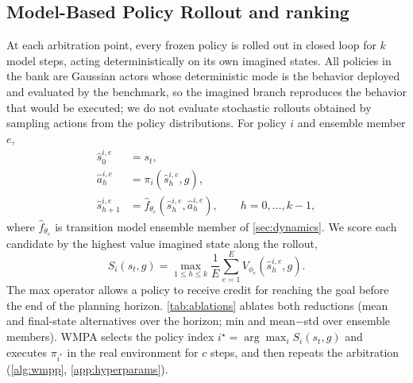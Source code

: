 \documentclass{article}
\theoremstyle{plain}
\theoremstyle{definition}
\theoremstyle{plain}
\newcommand{\wmpa}{\textsc{WMPA}}
\begin{document}
\subsection{Model-Based Policy Rollout and ranking}
\label{sec:counterfactual}
At each arbitration point, every frozen policy is rolled out in closed loop for $k$ model steps, acting deterministically on its own imagined states. All policies in the bank are Gaussian actors whose deterministic mode is the behavior deployed and evaluated by the benchmark, so the imagined branch reproduces the behavior that would be executed; we do not evaluate stochastic rollouts obtained by sampling actions from the policy distributions. For policy $i$ and ensemble member $e$,
\begin{align}
\hat{s}^{i,e}_{0} &= s_t,\\
\hat{a}^{i,e}_{h} &= \pi_i(\hat{s}^{i,e}_{h},g),\\
\hat{s}^{i,e}_{h+1} &= \hat{f}_{\theta_e}(\hat{s}^{i,e}_{h},\hat{a}^{i,e}_{h}),
\qquad h=0,\ldots,k-1,
\end{align}
where $\hat f_{\theta_e}$ is transition model ensemble member of \cref{sec:dynamics}.
We score each candidate by the highest value imagined state along the rollout,
\begin{equation}
S_i(s_t,g)=\max_{1\le h\le k}
\frac{1}{E}\sum_{e=1}^{E}
V_{\phi_e}(\hat{s}^{i,e}_{h},g).
\label{eq:score}
\end{equation}
The max operator allows a policy to receive credit for reaching the goal before the end of the planning horizon. \cref{tab:ablations} ablates both reductions (mean and final-state alternatives over the horizon; min and mean$-$std over ensemble members). \wmpa{} selects the policy index $i^\star=\arg\max_{i} S_i(s_t,g)$ and executes $\pi_{i^*}$ in the real environment for $c$ steps, and then repeats the arbitration (\cref{alg:wmpp}, \cref{app:hyperparams}).
\end{document}
